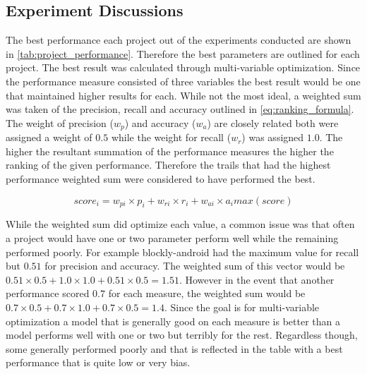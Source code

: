 \subsection{Experiment Discussions}

The best performance each project out of the experiments conducted are shown in \autoref{tab:project_performance}. Therefore the best parameters are outlined for each project. The best result was calculated through multi-variable optimization. Since the performance measure consisted of three variables the best result would be one that maintained higher results for each. While not the most ideal, a weighted sum was taken of the precision, recall and accuracy outlined in \autoref{eq:ranking_formula}. The weight of precision ($w_{p}$) and accuracy ($w_{a}$) are closely related both were assigned a weight of $0.5$ while the weight for recall ($w_{r}$) was assigned $1.0$. The higher the resultant summation of the performance measures the higher the ranking of the given performance. Therefore the trails that had the highest performance weighted sum were considered to have performed the best.

\begin{equation} 
\label{eq:ranking_formula}
score_i = w_{pi} \times p_i + w_{ri} \times r_i + w_{ai} \times a_i
max(score)
\end{equation}

While the weighted sum did optimize each value, a common issue was that often a project would have one or two parameter perform well while the remaining performed poorly. For example blockly-android had the maximum value for recall but $0.51$ for precision and accuracy. The weighted sum of this vector would be $0.51 \times 0.5 + 1.0 \times 1.0 + 0.51 \times 0.5 = 1.51$. However in the event that another performance scored $0.7$ for each measure, the weighted sum would be $0.7 \times 0.5 + 0.7 \times 1.0 + 0.7 \times 0.5 = 1.4$. Since the goal is for multi-variable optimization a model that is generally good on each measure is better than a model performs well with one or two but terribly for the rest. Regardless though, some generally performed poorly and that is reflected in the table with a best performance that is quite low or very bias. 


